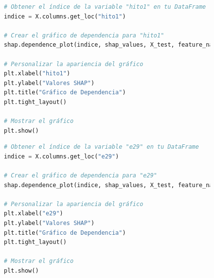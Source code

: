 \begin{figure}[H]
    \centering
    \begin{minipage}{0.48\textwidth}
        \begin{lstlisting}[language=Python, caption=Grafico de dependencia hito1, label=lst:grafDepHito1]
# Obtener el índice de la variable "hito1" en tu DataFrame
indice = X.columns.get_loc("hito1")

# Crear el gráfico de dependencia para "hito1"
shap.dependence_plot(indice, shap_values, X_test, feature_names=X.columns, show=False)

# Personalizar la apariencia del gráfico
plt.xlabel("hito1")
plt.ylabel("Valores SHAP")
plt.title("Gráfico de Dependencia")
plt.tight_layout()

# Mostrar el gráfico
plt.show()
        \end{lstlisting}
    \end{minipage}
    \hfill
    \begin{minipage}{0.48\textwidth}
        \begin{lstlisting}[language=Python, caption=Grafico de dependencia e29, label=lst:grafDepE29]
# Obtener el índice de la variable "e29" en tu DataFrame
indice = X.columns.get_loc("e29")

# Crear el gráfico de dependencia para "e29"
shap.dependence_plot(indice, shap_values, X_test, feature_names=X.columns, show=False)

# Personalizar la apariencia del gráfico
plt.xlabel("e29")
plt.ylabel("Valores SHAP")
plt.title("Gráfico de Dependencia")
plt.tight_layout()

# Mostrar el gráfico
plt.show()
        \end{lstlisting}
    \end{minipage}
\end{figure}

